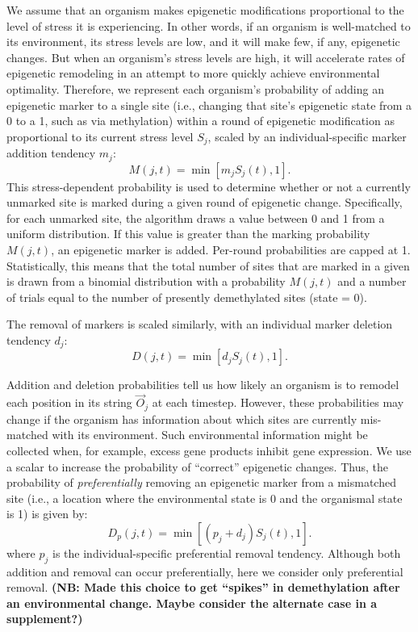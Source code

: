 \documentclass{article}
\begin{document}
We assume that an organism makes epigenetic modifications proportional to the level of stress it is experiencing. In other words, if an organism is well-matched to its environment, its stress levels are low, and it will make few, if any, epigenetic changes. But when an organism's stress levels are high, it will accelerate rates of epigenetic remodeling in an attempt to more quickly achieve environmental optimality. Therefore, we represent each organism's probability of adding an epigenetic marker to a single site (i.e., changing that site's epigenetic state from a 0 to a 1, such as via methylation) within a round of epigenetic modification as proportional to its current stress level $S_j$, scaled by an individual-specific marker addition tendency $m_j$:
\begin{equation}
    M(j,t) = \min\left[m_jS_j(t),1\right].
\end{equation}
This stress-dependent probability is used to determine whether or not a currently unmarked site is marked during a given round of epigenetic change. Specifically, for each unmarked site, the algorithm draws a value between 0 and 1 from a uniform distribution. If this value is greater than the marking probability $M(j,t)$, an epigenetic marker is added. Per-round probabilities are capped at 1. Statistically, this means that the total number of sites that are marked in a given is drawn from a binomial distribution with a probability $M(j,t)$ and a number of trials equal to the number of presently demethylated sites (state = 0). 

The removal of markers is scaled similarly, with an individual marker deletion tendency $d_j$:
\begin{equation}
    D(j,t) = \min \left[d_jS_j(t),1 \right].
\end{equation}

Addition and deletion probabilities tell us how likely an organism is to remodel each position in its string $\vec{O}_j$ at each timestep. However, these probabilities may change if the organism has information about which sites are currently mis-matched with its environment. Such environmental information might be collected when, for example, excess gene products inhibit gene expression. %
We use a scalar to increase the probability of ``correct'' epigenetic changes. Thus, the probability of \textit{preferentially} removing an epigenetic marker from a mismatched site (i.e., a location where the environmental state is 0 and the organismal state is 1) is given by:
\begin{equation}
    D_p(j,t) = \min\left[(p_j+d_j)S_j(t),1\right].
\end{equation}
where $p_j$ is the individual-specific preferential removal tendency. Although both addition and removal can occur preferentially, here we consider only preferential removal. \textbf{(NB: Made this choice to get ``spikes'' in demethylation after an environmental change. Maybe consider the alternate case in a supplement?)}
\end{document}
